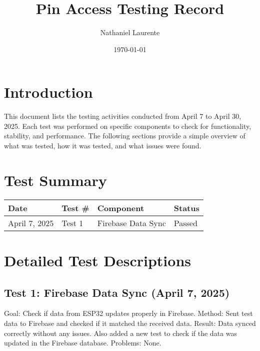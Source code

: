 \documentclass{article}
\title{Pin Access Testing Record}
\author{Nathaniel Laurente}
\date{\today}
\begin{document}
\maketitle

\section*{Introduction}
This document lists the testing activities conducted from April 7 to April 30, 2025. Each test was performed on specific components to check for functionality, stability, and performance. The following sections provide a simple overview of what was tested, how it was tested, and what issues were found.

\section*{Test Summary}
\begin{tabular}{| l | l | l | l |}
\hline
\textbf{Date} & \textbf{Test \#} & \textbf{Component} & \textbf{Status} \\
\hline
April 7, 2025 & Test 1 & Firebase Data Sync & Passed \\


\hline
\end{tabular}

\section*{Detailed Test Descriptions}

\subsection*{Test 1: Firebase Data Sync (April 7, 2025)}
Goal: Check if data from ESP32 updates properly in Firebase.
Method: Sent test data to Firebase and checked if it matched the received data.
Result: Data synced correctly without any issues. Also added a new test to check if the data was updated in the Firebase database.
Problems: None.
\end{document}
